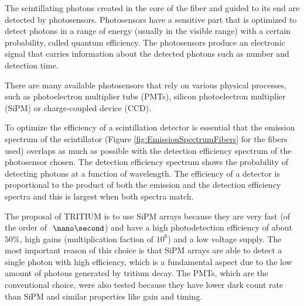 The scintillating photons created in the core of the fiber and guided to its end are detected by photosensors. Photosensors have a sensitive part that is optimized to detect photons in a range of energy (usually in the visible range) with a certain probability, called quantum efficiency. The photosensors produce an electronic signal that carries information about the detected photons such as number and detection time.

There are many available photosensors that rely on various physical processes, such as photoelectron multiplier tubs (PMTs), silicon photoelectron multiplier (SiPM) or charge-coupled device (CCD).  %

To optimize the efficiency of a scintillation detector is essential that the emission spectrum of the scintillator (Figure \ref{fig:EmissionSpectrumFibers} for the fibers used) overlaps as much as possible with the detection efficiency spectrum of the photosensor chosen. The detection efficiency spectrum shows the probability of detecting photons at a function of wavelength. The efficiency of a detector is proportional to the product of both the emission and the detection efficiency spectra and this is largest when both spectra match.

The proposal of TRITIUM is to use SiPM arrays because they are very fast (of the order of $~\nano\second$) and have a high photodetection efficiency of about $50\%$, high gains (multiplication faction of $10^{6}$) and a low voltage supply. The most important reason of this choice is that SiPM arrays are able to detect a single photon with high efficiency, which is a fundamental aspect due to the low amount of photons generated by tritium decay. The PMTs, which are the conventional choice, were also tested because they have lower dark count rate than SiPM and similar properties like gain and timing.





